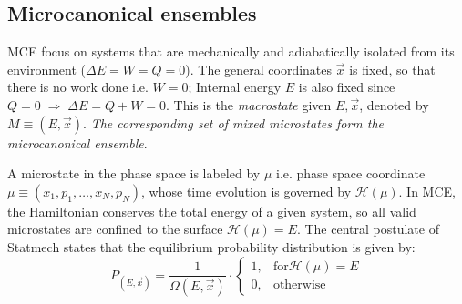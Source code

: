 \documentclass{article}
\begin{document}



























































\subsection*{Microcanonical ensembles}

MCE focus on systems that are mechanically and adiabatically isolated from its environment ($\Delta E = W = Q = 0$). The general coordinates $\vec{x}$ is fixed, so that there is no work done i.e. $W = 0$; Internal energy  $E$ is also fixed since  $Q = 0\;\Rightarrow\;\Delta E = Q+W = 0$. This is the \textit{macrostate} given  $E, \vec{x}$, denoted by $M \equiv (E,\vec{x})$. \textit{The corresponding set of mixed microstates form the microcanonical ensemble}. 

A microstate in the phase space is labeled by $\mu$ i.e. phase space coordinate $\mu \equiv (x_1,p_1,\ldots,x_N,p_N)$, whose time evolution is governed by  $\mathcal{H}(\mu)$. In MCE, the Hamiltonian conserves the total energy of a given system, so all valid microstates are confined to the surface $\mathcal{H}(\mu) = E$. The central postulate of Statmech states that the equilibrium probability distribution is given by:
\begin{equation}
	P_{(E,\vec{x})} = \frac{1}{\Omega(E,\vec{x})}\cdot
	\begin{cases}
		1, & \text{for} \mathcal{H}(\mu) = E \\
		0, &\text{otherwise}
	\end{cases}
\end{equation}
\end{document}
